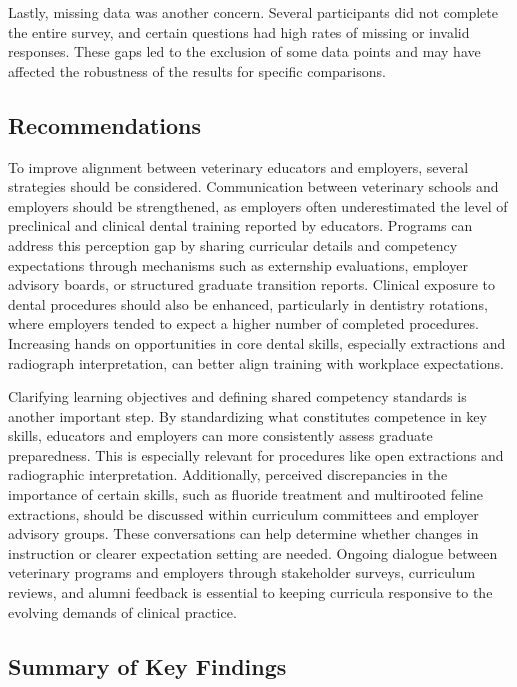 \documentclass[
  12pt,
  letterpaper,
  DIV=11,
  numbers=noendperiod]{scrartcl}
\numberwithin{figure}{section}
\numberwithin{table}{section}
\begin{document}
Lastly, missing data was another concern. Several participants did not
complete the entire survey, and certain questions had high rates of
missing or invalid responses. These gaps led to the exclusion of some
data points and may have affected the robustness of the results for
specific comparisons.

\subsection{Recommendations}\label{recommendations}

To improve alignment between veterinary educators and employers, several
strategies should be considered. Communication between veterinary
schools and employers should be strengthened, as employers often
underestimated the level of preclinical and clinical dental training
reported by educators. Programs can address this perception gap by
sharing curricular details and competency expectations through
mechanisms such as externship evaluations, employer advisory boards, or
structured graduate transition reports. Clinical exposure to dental
procedures should also be enhanced, particularly in dentistry rotations,
where employers tended to expect a higher number of completed
procedures. Increasing hands on opportunities in core dental skills,
especially extractions and radiograph interpretation, can better align
training with workplace expectations.

Clarifying learning objectives and defining shared competency standards
is another important step. By standardizing what constitutes competence
in key skills, educators and employers can more consistently assess
graduate preparedness. This is especially relevant for procedures like
open extractions and radiographic interpretation. Additionally,
perceived discrepancies in the importance of certain skills, such as
fluoride treatment and multirooted feline extractions, should be
discussed within curriculum committees and employer advisory groups.
These conversations can help determine whether changes in instruction or
clearer expectation setting are needed. Ongoing dialogue between
veterinary programs and employers through stakeholder surveys,
curriculum reviews, and alumni feedback is essential to keeping
curricula responsive to the evolving demands of clinical practice.

\subsection{Summary of Key Findings}\label{summary-of-key-findings}
\end{document}
